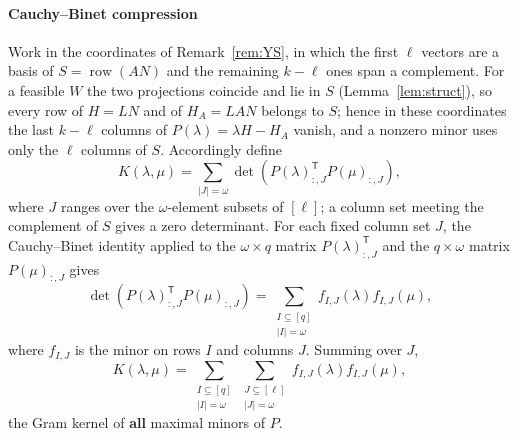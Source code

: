 \documentclass[journal]{IEEEtran}
\theoremstyle{plainn}
\theoremstyle{remark}
\begin{document}
\paragraph*{Cauchy--Binet compression}\label{sec:cb}
Work in the coordinates of Remark~\ref{rem:YS}, in which the first $\ell$ vectors are a basis of
$S=\operatorname{row}(AN)$ and the remaining $k-\ell$ ones span a complement. For a feasible $W$ the
two projections coincide and lie in $S$ (Lemma~\ref{lem:struct}), so every row of $H=LN$ and of
$H_A=LAN$ belongs to $S$; hence in these coordinates the last $k-\ell$ columns of $P(\lambda)=\lambda
H-H_A$ vanish, and a nonzero minor uses only the $\ell$ columns of $S$. Accordingly define
\begin{equation*}
K(\lambda,\mu)=\sum_{|J|=\omega}
\det\left(P(\lambda)_{:,J}^{\mathsf T}P(\mu)_{:,J}\right),
\end{equation*}
where $J$ ranges over the $\omega$-element subsets of $[\ell]$; a column set meeting the
complement of $S$ gives a zero determinant. For each fixed column set $J$, the Cauchy--Binet identity
\cite[Ch.~0]{hj13} applied
to the $\omega\times q$ matrix $P(\lambda)_{:,J}^{\mathsf T}$ and the
$q\times\omega$ matrix $P(\mu)_{:,J}$ gives
\begin{equation*}
\det\!\left(P(\lambda)_{:,J}^{\mathsf T}P(\mu)_{:,J}\right)
=\sum_{\substack{I\subseteq[q]\\ |I|=\omega}}
f_{I,J}(\lambda)f_{I,J}(\mu),
\end{equation*}
where $f_{I,J}$ is the minor on rows $I$ and columns $J$. Summing over $J$,
\begin{equation*}
K(\lambda,\mu)=\sum_{\substack{I\subseteq[q]\\ |I|=\omega}}
\sum_{\substack{J\subseteq[\ell]\\ |J|=\omega}}
f_{I,J}(\lambda)f_{I,J}(\mu),
\end{equation*}
the Gram kernel of \textbf{all} maximal minors of $P$.
\end{document}
